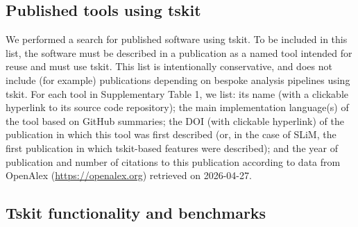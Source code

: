 \documentclass{article}
\begin{document}

% 


\subsection*{Published tools using tskit}
We performed a search for published software using tskit.
To be included in this list, the software must be described in a publication
as a named tool intended for reuse and must use tskit.
This list is intentionally conservative, and does not include
(for example) publications depending on bespoke analysis
pipelines using tskit.
For each tool in Supplementary Table 1, we list: its name (with a clickable
hyperlink to its source code repository);
the main implementation
language(s) of the tool based on GitHub summaries;
the DOI (with clickable hyperlink) of the publication in which this
tool was first described (or, in the case of SLiM, the first
publication in which tskit-based features were described);
and the year of publication and number of citations to this
publication according to data from OpenAlex
(\url{https://openalex.org}) retrieved on 2026-04-27.



\subsection*{Tskit functionality and benchmarks}
\end{document}

